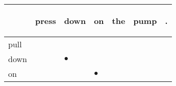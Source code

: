 \documentclass[landscape]{article}
\newcommand{\ssp}{\hspace{2pt}}
\newcommand{\mex}{\cellcolor{g}$\bullet$}
\begin{document}
\noindent\begin{tabular}{|l|p{10pt}|p{10pt}|p{10pt}|p{10pt}|p{10pt}|p{10pt}|}
\hline
&\begin{sideways}\cellcolor{ref0}press\hspace{12pt}\end{sideways}&\begin{sideways}\cellcolor{ref1}down\hspace{12pt}\end{sideways}&\begin{sideways}\cellcolor{ref2}on\hspace{12pt}\end{sideways}&\begin{sideways}\cellcolor{ref3}the\hspace{12pt}\end{sideways}&\begin{sideways}\cellcolor{ref4}pump\hspace{12pt}\end{sideways}&\begin{sideways}\cellcolor{ref5}.\hspace{12pt}\end{sideways}\\
\hline
\ssp pull \ssp&\hspace{2pt}&\hspace{2pt}&\hspace{2pt}&\hspace{2pt}&\hspace{2pt}&\hspace{2pt}\\
\hline
\ssp \cellcolor{ref1}down \ssp&\hspace{2pt}&\hspace{2pt}\mex&\hspace{2pt}&\hspace{2pt}&\hspace{2pt}&\hspace{2pt}\\
\hline
\ssp \cellcolor{ref2}on \ssp&\hspace{2pt}&\hspace{2pt}&\hspace{2pt}\mex&\hspace{2pt}&\hspace{2pt}&\hspace{2pt}\\

\end{tabular}
\end{document}
